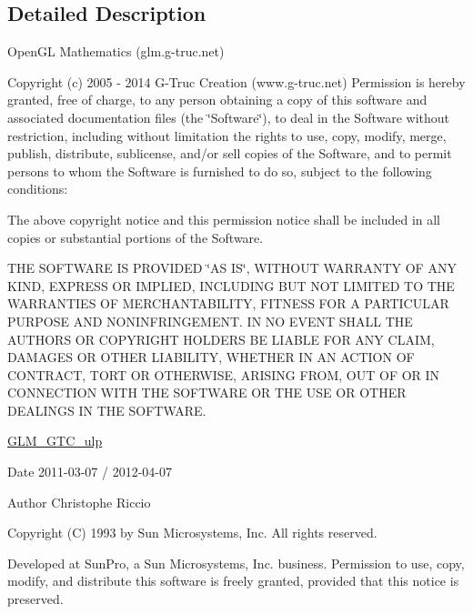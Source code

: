 \subsection{Detailed Description}
Open\+GL Mathematics (glm.\+g-\/truc.\+net)

Copyright (c) 2005 -\/ 2014 G-\/\+Truc Creation (www.\+g-\/truc.\+net) Permission is hereby granted, free of charge, to any person obtaining a copy of this software and associated documentation files (the \char`\"{}\+Software\char`\"{}), to deal in the Software without restriction, including without limitation the rights to use, copy, modify, merge, publish, distribute, sublicense, and/or sell copies of the Software, and to permit persons to whom the Software is furnished to do so, subject to the following conditions\+:

The above copyright notice and this permission notice shall be included in all copies or substantial portions of the Software.

T\+HE S\+O\+F\+T\+W\+A\+RE IS P\+R\+O\+V\+I\+D\+ED \char`\"{}\+A\+S I\+S\char`\"{}, W\+I\+T\+H\+O\+UT W\+A\+R\+R\+A\+N\+TY OF A\+NY K\+I\+ND, E\+X\+P\+R\+E\+SS OR I\+M\+P\+L\+I\+ED, I\+N\+C\+L\+U\+D\+I\+NG B\+UT N\+OT L\+I\+M\+I\+T\+ED TO T\+HE W\+A\+R\+R\+A\+N\+T\+I\+ES OF M\+E\+R\+C\+H\+A\+N\+T\+A\+B\+I\+L\+I\+TY, F\+I\+T\+N\+E\+SS F\+OR A P\+A\+R\+T\+I\+C\+U\+L\+AR P\+U\+R\+P\+O\+SE A\+ND N\+O\+N\+I\+N\+F\+R\+I\+N\+G\+E\+M\+E\+NT. IN NO E\+V\+E\+NT S\+H\+A\+LL T\+HE A\+U\+T\+H\+O\+RS OR C\+O\+P\+Y\+R\+I\+G\+HT H\+O\+L\+D\+E\+RS BE L\+I\+A\+B\+LE F\+OR A\+NY C\+L\+A\+IM, D\+A\+M\+A\+G\+ES OR O\+T\+H\+ER L\+I\+A\+B\+I\+L\+I\+TY, W\+H\+E\+T\+H\+ER IN AN A\+C\+T\+I\+ON OF C\+O\+N\+T\+R\+A\+CT, T\+O\+RT OR O\+T\+H\+E\+R\+W\+I\+SE, A\+R\+I\+S\+I\+NG F\+R\+OM, O\+UT OF OR IN C\+O\+N\+N\+E\+C\+T\+I\+ON W\+I\+TH T\+HE S\+O\+F\+T\+W\+A\+RE OR T\+HE U\+SE OR O\+T\+H\+ER D\+E\+A\+L\+I\+N\+GS IN T\+HE S\+O\+F\+T\+W\+A\+RE.

\hyperlink{group__gtc__ulp}{G\+L\+M\+\_\+\+G\+T\+C\+\_\+ulp}

\begin{DoxyDate}{Date}
2011-\/03-\/07 / 2012-\/04-\/07 
\end{DoxyDate}
\begin{DoxyAuthor}{Author}
Christophe Riccio
\end{DoxyAuthor}
Copyright (C) 1993 by Sun Microsystems, Inc. All rights reserved.

Developed at Sun\+Pro, a Sun Microsystems, Inc. business. Permission to use, copy, modify, and distribute this software is freely granted, provided that this notice is preserved. 

